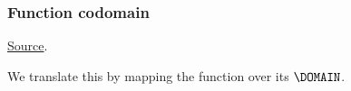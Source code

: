 \subsubsection{ Function codomain}
\href{https://github.com/saltiniroberto/ssf/blob/7ea6e18093d9da3154b4e396dd435549f687e6b9/high_level/common/pythonic_code_generic.py#L125-L126}{Source}.



\begin{mathpar}
\end{mathpar}
We translate this by mapping the function over its $\DOMAIN$.
